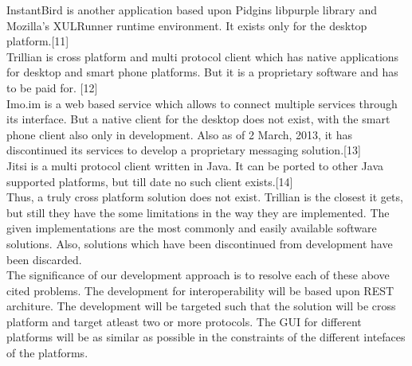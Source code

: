 \documentclass{SureshLimkar}
\begin{document}
\hspace{0.5 in}InstantBird is another application based upon Pidgins libpurple library and Mozilla's XULRunner runtime environment. It exists only for the desktop platform.[11]\\
\hspace{0.5 in}Trillian is cross platform and multi protocol client which has native applications for desktop and smart phone platforms. But it is a proprietary software and has to be paid for. [12]\\
\hspace{0.5 in}Imo.im is a web based service which allows to connect multiple services through its interface. But a native client for the desktop does not exist, with the smart phone client also only in development. Also as of 2 March, 2013, it has discontinued its services to develop a proprietary messaging solution.[13]\\
\hspace{0.5 in}Jitsi is a multi protocol client written in Java. It can be ported to other Java supported platforms, but till date no such client exists.[14]\\
\hspace{0.5 in}Thus, a truly cross platform solution does not exist.  Trillian is the closest it gets, but still they have the some limitations in the way they are implemented.
The given implementations are the most commonly and easily available software solutions. Also, solutions which have been discontinued from development have been discarded. 	\\
\hspace{0.5 in}The significance of our development approach is to resolve each of these above cited problems. The development for interoperability will be based upon REST architure. The development will be targeted such that the solution will be cross platform and target atleast two or more protocols. The GUI for different platforms will be as similar as possible in the constraints of the different intefaces of the platforms.\\
\newpage
\end{document}
